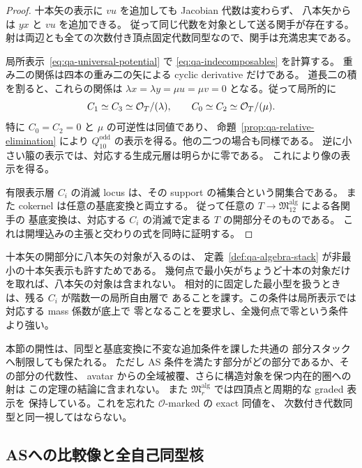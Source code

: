 \begin{proof}
十本矢の表示に $vu$ を追加しても Jacobian 代数は変わらず、
八本矢からは $yx$ と $vu$ を追加できる。
従って同じ代数を対象として送る関手が存在する。
射は両辺とも全ての次数付き頂点固定代数同型なので、関手は充満忠実である。

局所表示~\eqref{eq:qa-universal-potential} で
\eqref{eq:qa-indecomposables} を計算する。
重み二の関係は四本の重み二の矢による cyclic derivative だけである。
道長二の積を割ると、これらの関係は
$\lambda x=\lambda y=\mu u=\mu v=0$ となる。従って局所的に
\[
 C_1\simeq C_3\simeq\mathcal O_T/(\lambda),\qquad
 C_0\simeq C_2\simeq\mathcal O_T/(\mu).
\]
特に $C_0=C_2=0$ と $\mu$ の可逆性は同値であり、
命題~\ref{prop:qa-relative-elimination} により
$Q_{10}^{\mathrm{odd}}$ の表示を得る。他の二つの場合も同様である。
逆に小さい箙の表示では、対応する生成元層は明らかに零である。
これにより像の表示を得る。

有限表示層 $C_i$ の消滅 locus は、その support の補集合という開集合である。
また cokernel は任意の基底変換と両立する。
従って任意の $T\to\mathfrak M_{12}^{\mathrm{alg}}$ による各関手の
基底変換は、対応する $C_i$ の消滅で定まる $T$ の開部分そのものである。
これは開埋込みの主張と交わりの式を同時に証明する。
\end{proof}

\begin{remark}
\label{rem:qa-open-limits}
十本矢の開部分に八本矢の対象が入るのは、
定義~\ref{def:qa-algebra-stack} が非最小の十本矢表示も許すためである。
幾何点で最小矢がちょうど十本の対象だけを取れば、八本矢の対象は含まれない。
相対的に固定した最小型を扱うときは、残る $C_i$ が階数一の局所自由層で
あることを課す。この条件は局所表示では対応する mass 係数が底上で
零となることを要求し、全幾何点で零という条件より強い。

本節の開性は、同型と基底変換に不変な追加条件を課した共通の
部分スタックへ制限しても保たれる。
ただし AS 条件を満たす部分がどの部分であるか、その部分の代数性、
avatar からの全域被覆、さらに構造対象を保つ内在的圏への射は
この定理の結論に含まれない。
また $\mathfrak M_r^{\mathrm{alg}}$ では四頂点と周期的な graded 表示を
保持している。これを忘れた $\mathcal O$-marked の exact 同値を、
次数付き代数同型と同一視してはならない。
\end{remark}
\subsection{ASへの比較像と全自己同型核}
\label{subsec:qa-open-qp-canonical-comparison}

